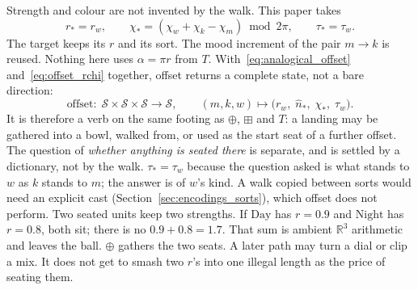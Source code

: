 \documentclass[12pt, a4paper]{article}
\begin{document}
Strength and colour are not invented by the walk. This paper takes
\begin{equation}
    r_{*}=r_w,
    \qquad
    \chi_{*}=(\chi_w+\chi_k-\chi_m)\bmod 2\pi,
    \qquad
    \tau_{*}=\tau_w.
    \label{eq:offset_rchi}
\end{equation}
The target keeps its $r$ and its sort. The mood increment of the pair
$m\to k$ is reused. Nothing here uses $\alpha=\pi r$ from $T$.
With~\eqref{eq:analogical_offset} and~\eqref{eq:offset_rchi} together,
offset returns a complete state, not a bare direction:
\[
\text{offset}:\;\mathcal{S}\times\mathcal{S}\times\mathcal{S}
\longrightarrow\mathcal{S},
\qquad
(m,k,w)\mapsto
\bigl(r_w,\;\hat n_{*},\;\chi_{*},\;\tau_w\bigr).
\]
It is therefore a verb on the same footing as $\oplus$, $\boxplus$ and
$T$: a landing may be gathered into a bowl, walked from, or used as
the start seat of a further offset. The question of \emph{whether
anything is seated there} is separate, and is settled by a dictionary,
not by the walk. $\tau_{*}=\tau_w$ because the question asked is what
stands to $w$ as $k$ stands to $m$; the answer is of $w$'s kind. A
walk copied between sorts would need an explicit cast
(Section~\ref{sec:encodings_sorts}), which offset does not perform.
Two seated units keep two strengths. If $\mathrm{Day}$ has $r=0.9$
and $\mathrm{Night}$ has $r=0.8$, both sit; there is no
$0.9+0.8=1.7$. That sum is ambient $\mathbb{R}^3$ arithmetic and
leaves the ball. $\oplus$ gathers the two seats. A later path may
turn a dial or clip a mix. It does not get to smash two $r$'s into
one illegal length as the price of seating them.
\end{document}
